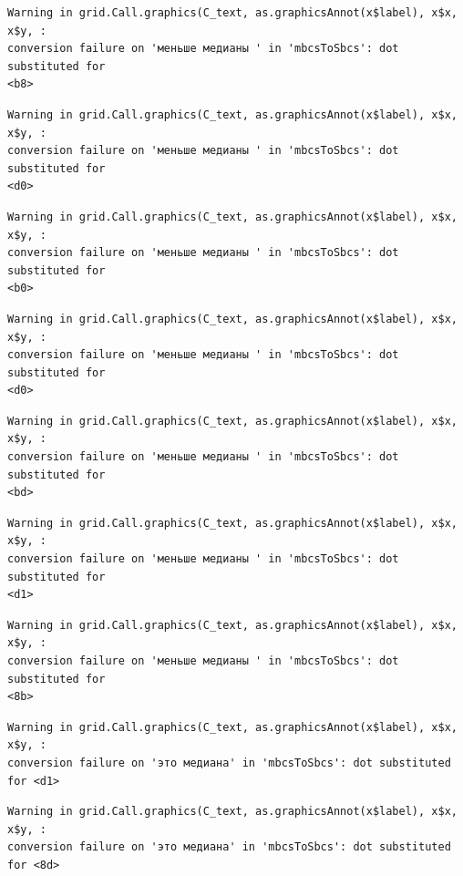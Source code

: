 \documentclass[
  letterpaper,
  DIV=11,
  numbers=noendperiod]{scrreprt}
\theoremstyle{definition}
\theoremstyle{remark}
\begin{document}
\begin{verbatim}
Warning in grid.Call.graphics(C_text, as.graphicsAnnot(x$label), x$x, x$y, :
conversion failure on 'меньше медианы ' in 'mbcsToSbcs': dot substituted for
<b8>
\end{verbatim}

\begin{verbatim}
Warning in grid.Call.graphics(C_text, as.graphicsAnnot(x$label), x$x, x$y, :
conversion failure on 'меньше медианы ' in 'mbcsToSbcs': dot substituted for
<d0>
\end{verbatim}

\begin{verbatim}
Warning in grid.Call.graphics(C_text, as.graphicsAnnot(x$label), x$x, x$y, :
conversion failure on 'меньше медианы ' in 'mbcsToSbcs': dot substituted for
<b0>
\end{verbatim}

\begin{verbatim}
Warning in grid.Call.graphics(C_text, as.graphicsAnnot(x$label), x$x, x$y, :
conversion failure on 'меньше медианы ' in 'mbcsToSbcs': dot substituted for
<d0>
\end{verbatim}

\begin{verbatim}
Warning in grid.Call.graphics(C_text, as.graphicsAnnot(x$label), x$x, x$y, :
conversion failure on 'меньше медианы ' in 'mbcsToSbcs': dot substituted for
<bd>
\end{verbatim}

\begin{verbatim}
Warning in grid.Call.graphics(C_text, as.graphicsAnnot(x$label), x$x, x$y, :
conversion failure on 'меньше медианы ' in 'mbcsToSbcs': dot substituted for
<d1>
\end{verbatim}

\begin{verbatim}
Warning in grid.Call.graphics(C_text, as.graphicsAnnot(x$label), x$x, x$y, :
conversion failure on 'меньше медианы ' in 'mbcsToSbcs': dot substituted for
<8b>
\end{verbatim}

\begin{verbatim}
Warning in grid.Call.graphics(C_text, as.graphicsAnnot(x$label), x$x, x$y, :
conversion failure on 'это медиана' in 'mbcsToSbcs': dot substituted for <d1>
\end{verbatim}

\begin{verbatim}
Warning in grid.Call.graphics(C_text, as.graphicsAnnot(x$label), x$x, x$y, :
conversion failure on 'это медиана' in 'mbcsToSbcs': dot substituted for <8d>
\end{verbatim}
\end{document}
